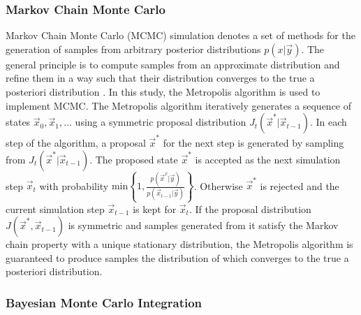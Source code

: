 \documentclass[journal abbreviation, manuscript]{copernicus}
\begin{document}
\subsubsection{Markov Chain Monte Carlo}

Markov Chain Monte Carlo (MCMC) simulation denotes a set of methods for the
generation of samples from arbitrary posterior distributions $p(x | \vec{y})$.
The general principle is to compute samples from an approximate distribution and
refine them in a way such that their distribution converges to the true a
posteriori distribution \citep{bda}. In this study, the Metropolis algorithm is
used to implement MCMC. The Metropolis algorithm iteratively generates a
sequence of states $\vec{x}_0, \vec{x}_1, \ldots$ using a symmetric proposal
distribution $J_t(\vec{x}^* | \vec{x}_{t-1})$. In each step of the algorithm, a
proposal $\vec{x}^*$ for the next step is generated by sampling from
$J_t(\vec{x}^* | \vec{x}_{t-1})$. The proposed state $\vec{x}^*$ is accepted as
the next simulation step $\vec{x}_t$ with probability $\text{min} \left \{1,
\frac{p(\vec{x}^x | \vec{y})}{p(\vec{x}_{t-1} | \vec{y})} \right \}$. Otherwise
$\vec{x}^*$ is rejected and the current simulation step $\vec{x}_{t-1}$ is kept
for $\vec{x}_t$. If the proposal distribution $J(\vec{x}^*, \vec{x}_{t-1})$ is
symmetric and samples generated from it satisfy the Markov chain property with a
unique stationary distribution, the Metropolis algorithm is guaranteed to
produce samples the distribution of which converges to the true a posteriori
distribution.

\subsubsection{Bayesian Monte Carlo Integration}
\end{document}
